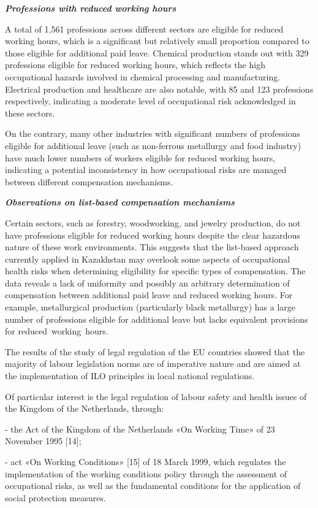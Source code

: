 \emph{{\bfseries Professions with reduced working hours}}

A total of 1,561 professions across different sectors are eligible for
reduced working hours, which is a significant but relatively small
proportion compared to those eligible for additional paid leave.
Chemical production stands out with 329 professions eligible for reduced
working hours, which reflects the high occupational hazards involved in
chemical processing and manufacturing. Electrical production and
healthcare are also notable, with 85 and 123 professions respectively,
indicating a moderate level of occupational risk acknowledged in these
sectors.

On the contrary, many other industries with significant numbers of
professions eligible for additional leave (such as non-ferrous
metallurgy and food industry) have much lower numbers of workers
eligible for reduced working hours, indicating a potential inconsistency
in how occupational risks are managed between different compensation
mechanisms.

\emph{{\bfseries Observations on list-based compensation mechanisms}}

Certain sectors, such as forestry, woodworking, and jewelry production,
do not have professions eligible for reduced working hours despite the
clear hazardous nature of these work environments. This suggests that
the list-based approach currently applied in Kazakhstan may overlook
some aspects of occupational health risks when determining eligibility
for specific types of compensation. The data reveals a lack of
uniformity and possibly an arbitrary determination of compensation
between additional paid leave and reduced working hours. For example,
metallurgical production (particularly black metallurgy) has a large
number of professions eligible for additional leave but lacks equivalent
provisions for reduced~working~hours.

The results of the study of legal regulation of the EU countries showed
that the majority of labour legislation norms are of imperative nature
and are aimed at the implementation of ILO principles in local national
regulations.

Of particular interest is the legal regulation of labour safety and
health issues of the Kingdom of the Netherlands, through:

- the Act of the Kingdom of the Netherlands «On Working Time» of 23
November 1995 {[}14{]};

- act «On Working Conditions» {[}15{]} of 18 March 1999, which regulates
the implementation of the working conditions policy through the
assessment of occupational risks, as well as the fundamental conditions
for the application of social protection measures.

